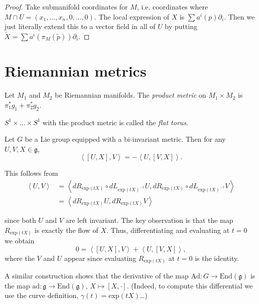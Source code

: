 \begin{proof}
Take submanifold coordinates for $M$,
i.e. coordinates where $M\cap U =(x_1,…,x_n,0,…,0)$.
The local expression of $X$ is
$\sum a^i(p)\partial_i$.
Then we just literally extend this to a vector
field in all of $U$ by putting
$\tilde{X}=\sum a^i(\pi_M(\tilde{p}))\partial_i$.
\end{proof}

\section{Riemannian metrics}
\label{section-Riemannian-metrics}

\begin{definition}
\label{definition-product-metric}
Let $M_1$ and $M_2$ be Riemannian manifolds. The {\it product metric} on
$M_1\times M_2$ is $\pi_1^*g_1+\pi_2^*g_2$.
\end{definition}

\begin{definition}
\label{definition-flat-torus}
$S^1\times\ldots\times S^1$ with the product metric is called the {\it flat
torus}.
\end{definition}

\medskip\noindent
Let $G$ be a Lie group equipped with a bi-invariant metric.
Then for any $U,V,X \in \mathfrak{g}$,
\begin{equation}
\label{equation-lie-group-bi-invariant-metric-and-lie-bracket}
\left<[U,X],V\right>=-\left<U,[V,X]\right>.
\end{equation}

\noindent
This follows from
\begin{align*}
\left<U,V\right>&=
\left<dR_{\text{exp}(tX)}\circ dL_{\text{exp}(tX)^{-1}}U,
dR_{\text{exp}(tX)}\circ dL_{\text{exp}(tX)^{-1}}V\right>\\
&=\left<dR_{\text{exp}(tX)}U,
dR_{\text{exp}(tX)}V\right>
\end{align*}

\noindent
since both $U$ and $V$ are left invariant.
The key observation is that the map $R_{\text{exp}(tX)}$
is exactly the flow of $X$.
Thus, differentiating and evaluating at $t=0$
we obtain
$$
0=\left<[U,X],V\right>+\left<U,[V,X]\right>,
$$
where the $V$ and $U$ appear since evaluating
$R_{\text{exp}(tX)}$ at $t=0$ is the identity.

A similar construction shows that the derivative of the map
$\text{Ad}:G \to \text{End}(\mathfrak{g})$
is the map $\text{ad}:\mathfrak{g} \to \text{End}(\mathfrak{g})$,
$X \mapsto [X,\cdot]$.
(Indeed, to compute this differential we use
the curve definition, $\gamma(t)=\text{exp}(tX)$…)

